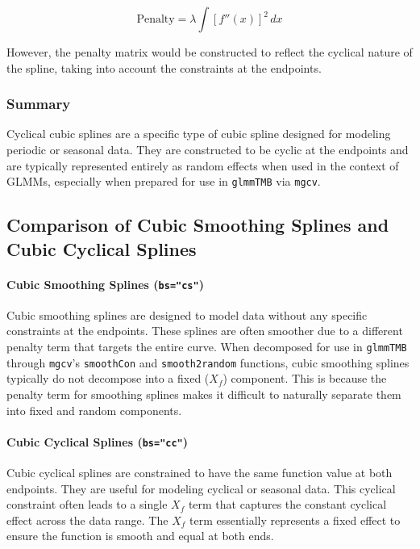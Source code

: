 \documentclass{article}
\begin{document}
\[
\text{Penalty} = \lambda \int [f''(x)]^2 \, dx
\]

However, the penalty matrix would be constructed to reflect the cyclical nature of the spline, taking into account the constraints at the endpoints.


\subsubsection{Summary}

Cyclical cubic splines are a specific type of cubic spline designed for modeling periodic or seasonal data. They are constructed to be cyclic at the endpoints and are typically represented entirely as random effects when used in the context of GLMMs, especially when prepared for use in \texttt{glmmTMB} via \texttt{mgcv}.

\subsection{Comparison of Cubic Smoothing Splines and Cubic Cyclical Splines}

\paragraph{Cubic Smoothing Splines (\texttt{bs="cs"})}

Cubic smoothing splines are designed to model data without any specific constraints at the endpoints. These splines are often smoother due to a different penalty term that targets the entire curve. When decomposed for use in \texttt{glmmTMB} through \texttt{mgcv}'s \texttt{smoothCon} and \texttt{smooth2random} functions, cubic smoothing splines typically do not decompose into a fixed (\(X_f\)) component. This is because the penalty term for smoothing splines makes it difficult to naturally separate them into fixed and random components.

\paragraph{Cubic Cyclical Splines (\texttt{bs="cc"})}

Cubic cyclical splines are constrained to have the same function value at both endpoints. They are useful for modeling cyclical or seasonal data. This cyclical constraint often leads to a single \(X_f\) term that captures the constant cyclical effect across the data range. The \(X_f\) term essentially represents a fixed effect to ensure the function is smooth and equal at both ends.
\end{document}
